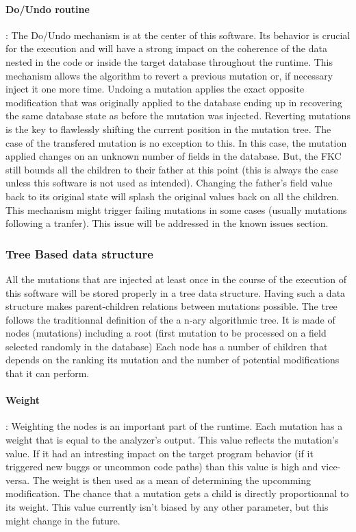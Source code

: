 \documentclass{article}
\begin{document}
\begin{empfile}
				\paragraph{Do/Undo routine} :
The Do/Undo mechanism is at the center of this software. Its behavior is crucial for the execution and will have a strong impact on the coherence of the data nested in the code or inside the target database throughout the runtime.
This mechanism allows the algorithm to revert a previous mutation or, if necessary inject it one more time. 
Undoing a mutation applies the exact opposite modification that was originally applied to the database ending up in recovering the same database state as before the mutation was injected.
Reverting mutations is the key to flawlessly shifting the current position in the mutation tree.
The case of the transfered mutation is no exception to this. In this case, the mutation applied changes on an unknown number of fields in the database. But, the FKC still bounds all the children to their father at this point (this is always the case unless this software is not used as intended).  
Changing the father's field value back to its original state will splash the original values back on all the children.
This mechanism might trigger failing mutations in some cases (usually mutations following a tranfer). This issue will be addressed in the known issues section. 
			\subsubsection{Tree Based data structure}
All the mutations that are injected at least once in the course of the execution of this software will be stored properly in a tree data structure. Having such a data structure makes parent-children relations between mutations possible. The tree follows the traditionnal definition of the a n-ary algorithmic tree.
It is made of nodes (mutations) including a root (first mutation to be processed on a field selected randomly in the database)  
Each node has a number of children that depends on the ranking its mutation and the number of potential modifications that it can perform.
				\paragraph{Weight} :
Weighting the nodes is an important part of the runtime. Each mutation has a weight that is equal to the analyzer's output. This value reflects the mutation's value. If it had an intresting impact on the target program behavior (if it triggered new buggs or uncommon code paths) than this value is high and vice-versa. The weight is then used as a mean of determining the upcomming modification. The chance that a mutation gets a child is directly proportionnal to its weight.
This value currently isn't biased by any other parameter, but this might change in the future.  

\end{empfile}
\end{document}

